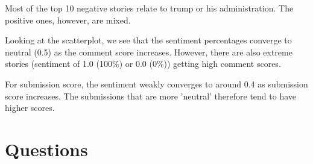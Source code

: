 \documentclass[11pt]{article}
\begin{document}
Most of the top 10 negative stories relate to trump or his administration. The positive ones, however, are mixed.

Looking at the scatterplot, we see that the sentiment percentages converge to neutral (0.5) as the comment score increases. However, there are also extreme stories (sentiment of 1.0 (100\%) or 0.0 (0\%)) getting high comment scores.

For submission score, the sentiment weakly converges to around 0.4 as submission score increases. The submissions that are more 'neutral' therefore tend to have higher scores.

\section{Questions}
\end{document}
